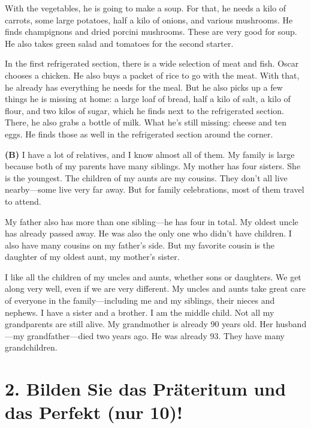 \documentclass[a4paper,12pt]{article}
\begin{document}
With the vegetables, he is going to make a soup. For that, he needs a kilo of carrots, some large potatoes, half a kilo of onions, and various mushrooms. He finds champignons and dried porcini mushrooms. These are very good for soup. He also takes green salad and tomatoes for the second starter.

In the first refrigerated section, there is a wide selection of meat and fish. Oscar chooses a chicken. He also buys a packet of rice to go with the meat. With that, he already has everything he needs for the meal. But he also picks up a few things he is missing at home: a large loaf of bread, half a kilo of salt, a kilo of flour, and two kilos of sugar, which he finds next to the refrigerated section. There, he also grabs a bottle of milk. What he’s still missing: cheese and ten eggs. He finds those as well in the refrigerated section around the corner.

\vspace{1em}

\textbf{(B)} I have a lot of relatives, and I know almost all of them. My family is large because both of my parents have many siblings. My mother has four sisters. She is the youngest. The children of my aunts are my cousins. They don’t all live nearby—some live very far away. But for family celebrations, most of them travel to attend.

My father also has more than one sibling—he has four in total. My oldest uncle has already passed away. He was also the only one who didn’t have children. I also have many cousins on my father’s side. But my favorite cousin is the daughter of my oldest aunt, my mother’s sister.

I like all the children of my uncles and aunts, whether sons or daughters. We get along very well, even if we are very different. My uncles and aunts take great care of everyone in the family—including me and my siblings, their nieces and nephews. I have a sister and a brother. I am the middle child. Not all my grandparents are still alive. My grandmother is already 90 years old. Her husband—my grandfather—died two years ago. He was already 93. They have many grandchildren.


\vspace{1cm}

\section*{2. Bilden Sie das Präteritum und das Perfekt (nur 10)!}
\end{document}
